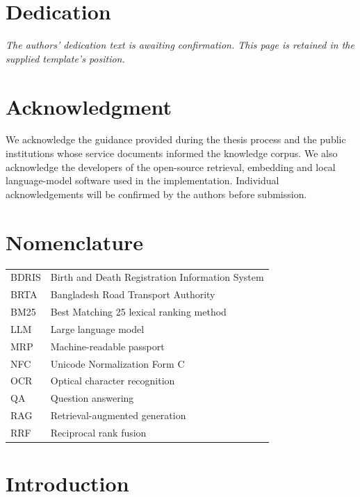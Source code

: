 \documentclass[12pt,oneside,openany]{report}
\begin{document}
\hypersetup{pageanchor=false}

\hypersetup{pageanchor=true}


\chapter*{Dedication}
\textit{The authors' dedication text is awaiting confirmation. This page is retained in the supplied template's position.}
\chapter*{Acknowledgment}
We acknowledge the guidance provided during the thesis process and the public institutions whose service documents informed the knowledge corpus. We also acknowledge the developers of the open-source retrieval, embedding and local language-model software used in the implementation. Individual acknowledgements will be confirmed by the authors before submission.
\renewcommand{\contentsname}{Table of Contents}
\clearpage{}
\tableofcontents
\listoffigures
\listoftables
\chapter*{Nomenclature}
\begin{tabularx}{\linewidth}{lX}
BDRIS & Birth and Death Registration Information System\\
BRTA & Bangladesh Road Transport Authority\\
BM25 & Best Matching 25 lexical ranking method\\
LLM & Large language model\\
MRP & Machine-readable passport\\
NFC & Unicode Normalization Form C\\
OCR & Optical character recognition\\
QA & Question answering\\
RAG & Retrieval-augmented generation\\
RRF & Reciprocal rank fusion\\
\end{tabularx}
\clearpage{}
\chapter{Introduction}
\end{document}
